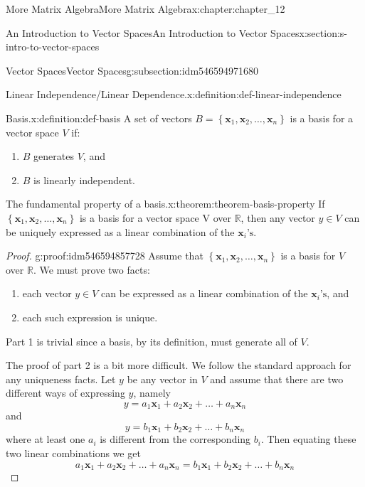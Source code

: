 \documentclass[oneside,10pt,]{book}
\numberwithin{equation}{section}
\renewcommand{\vec}[1]{\mathbf{#1}}
\begin{document}
\begin{chapterptx}{More Matrix Algebra}{}{More Matrix Algebra}{}{}{x:chapter:chapter_12}
\begin{sectionptx}{An Introduction to Vector Spaces}{}{An Introduction to Vector Spaces}{}{}{x:section:s-intro-to-vector-spaces}
\begin{subsectionptx}{Vector Spaces}{}{Vector Spaces}{}{}{g:subsection:idm546594971680}
\begin{definition}{Linear Independence\slash{}Linear Dependence.}{x:definition:def-linear-independence}
\end{definition}
\begin{definition}{Basis.}{x:definition:def-basis}%
%
A set of vectors \(B=\left\{\vec{x}_1,\vec{x}_2, \ldots ,\vec{x}_n\right\}\) is a basis for a vector space \(V\) if:%
\begin{enumerate}[label=(\arabic*)]
\item{}\(B\) generates \(V\), and%
\item{}\(B\) is linearly independent.%
\end{enumerate}
%
\end{definition}
\begin{theorem}{The fundamental property of a basis.}{}{x:theorem:theorem-basis-property}%
If \(\left\{\vec{x}_1,\vec{x}_2, \ldots ,\vec{x}_n\right\}\) is a basis for a vector space V over \(\mathbb{R}\), then any vector \(y \in V\) can be uniquely expressed as a linear combination of the \(\vec{x}_i\textrm{'s}\).%
\end{theorem}
\begin{proof}{}{g:proof:idm546594857728}
Assume that \(\left\{\vec{x}_1,\vec{x}_2, \ldots ,\vec{x}_n\right\}\) is a basis for \(V\) over \(\mathbb{R}\). We must prove two facts:%
\begin{enumerate}[label=(\arabic*)]
\item{}each vector \(y \in V\) can be expressed as a linear combination of the \(\vec{x}_i\textrm{'s}\), and%
\item{}each such expression is unique.%
\end{enumerate}
%
\par
Part 1 is trivial since a basis, by its definition, must generate all of  \(V\).%
\par
The proof of part 2 is a bit more difficult. We follow the standard approach for any uniqueness facts. Let \(y\) be any vector in \(V\) and assume that there are two different ways of expressing \(y\), namely%
\begin{equation*}
y = a_1 \vec{x}_1+a_2 \vec{x}_2+\ldots +a_n \vec{x}_n
\end{equation*}
and%
\begin{equation*}
y = b_1 \vec{x}_1+b_2 \vec{x}_2+\ldots +b_n \vec{x}_n
\end{equation*}
where at least one \(a_i\) is different from the corresponding \(b_i\).   Then equating these two linear combinations we get%
\begin{equation*}
a_1 \vec{x}_1+a_2 \vec{x}_2+\ldots +a_n \vec{x}_n=b_1 \vec{x}_1+b_2 \vec{x}_2+\ldots +b_n \vec{x}_n

\end{equation*}
\end{proof}
\end{subsectionptx}
\end{sectionptx}
\end{chapterptx}
\end{document}
